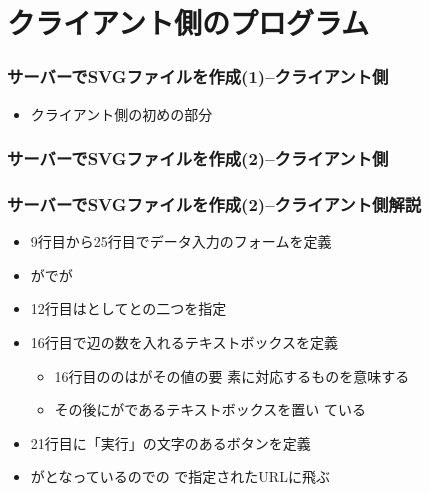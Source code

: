 

\frame{\maketitle}
\section{クライアント側のプログラム}
\begin{frame}[containsverbatim]
 \frametitle{サーバーでSVGファイルを作成(1)--クライアント側}
\begin{itemize}
 \item クライアント側の初めの部分
\end{itemize} 
\end{frame}
\begin{frame}[containsverbatim]
 \frametitle{サーバーでSVGファイルを作成(2)--クライアント側}
\end{frame}
\begin{frame}[containsverbatim]
 \frametitle{サーバーでSVGファイルを作成(2)--クライアント側解説}
 \begin{itemize}
	\item 9行目から25行目でデータ入力のフォームを定義
	\item {}がでが
	\item 12行目はとしてとの二つを指定
	\item 16行目で辺の数を入れるテキストボックスを定義
				\begin{itemize}
				 \item 16行目ののはがその値の要
							 素に対応するものを意味する
				 \item その後にがであるテキストボックスを置い
							 ている
				\end{itemize}
	\item 21行目に「実行」の文字のあるボタンを定義
	\item {}がとなっているのでの
				で指定されたURLに飛ぶ
 \end{itemize}
\end{frame}
